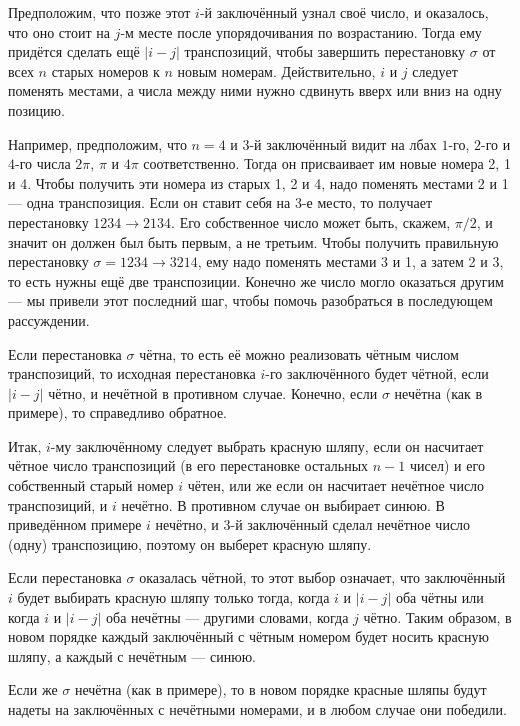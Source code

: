 Предположим, что позже этот $i$-й заключённый узнал своё число, и оказалось, что оно стоит на $j$-м месте после упорядочивания по возрастанию.
Тогда ему придётся сделать ещё $|i - j|$ транспозиций, чтобы завершить перестановку $\sigma$ от всех $n$ старых номеров к $n$ новым номерам.
Действительно, $i$ и $j$ следует поменять местами, а числа между ними нужно сдвинуть вверх или вниз на одну позицию.

Например, предположим, что $n = 4$ и $3$-й заключённый видит на лбах $1$-го, $2$-го и $4$-го числа $2\pi$, $\pi$ и $4\pi$ соответственно.
Тогда он присваивает им новые номера 2, 1 и 4.
Чтобы получить эти номера из старых 1, 2 и 4, надо поменять местами 2 и 1 --- одна транспозиция.
Если он ставит себя на 3-е место, то получает перестановку $1234 \to  2134$.
Его собственное число может быть, скажем, $\pi/2$, и значит он должен был быть первым, а не третьим.
Чтобы получить правильную перестановку  $\sigma  = 1234 \to  3214$, ему надо поменять местами 3 и 1, а затем 2 и 3, то есть нужны ещё две транспозиции.
Конечно же число могло оказаться другим --- мы привели этот последний шаг, чтобы помочь разобраться в последующем  рассуждении.

Если перестановка $\sigma$ чётна, то есть её можно реализовать чётным числом транспозиций, то исходная перестановка $i$-го заключённого будет чётной, если $|i - j|$ чётно, и нечётной в противном случае.
Конечно, если $\sigma$ нечётна (как в примере), то справедливо обратное.

Итак, $i$-му заключённому следует выбрать красную шляпу, если он насчитает чётное число транспозиций (в его перестановке остальных $n - 1$ чисел) и его собственный старый номер $i$ чётен, или же если он насчитает нечётное число транспозиций, и $i$ нечётно.
В противном случае он выбирает синюю.
В приведённом примере $i$ нечётно, и $3$-й заключённый сделал нечётное число (одну) транспозицию, поэтому он выберет красную шляпу.

Если перестановка $\sigma$ оказалась чётной, то этот выбор означает, что заключённый $i$ будет выбирать красную шляпу только тогда, когда $i$ и $|i - j|$ оба чётны или когда $i$ и $|i - j|$ оба нечётны --- другими словами, когда $j$ чётно.
Таким образом, в новом порядке каждый заключённый с чётным номером будет носить красную шляпу, а каждый с нечётным --- синюю.

Если же $\sigma$ нечётна (как в примере), то в новом порядке красные шляпы будут надеты на заключённых с нечётными номерами, и в любом случае они победили.

